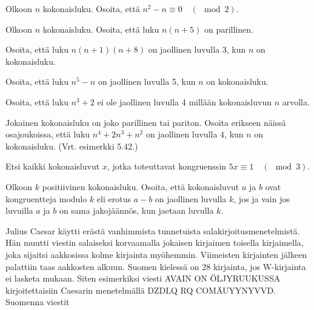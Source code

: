 \begin{tehtavasivu}
\begin{tehtava}
	Olkoon $n$ kokonaisluku. Osoita, että $n^2 - n \equiv 0\quad (\mod 2)$.
\end{tehtava}

\begin{tehtava}
	Olkoon $n$ kokonaisluku. Osoita, että luku $n(n + 5)$ on parillinen.
\end{tehtava}

\begin{tehtava}
	Osoita, että luku $n(n + 1)(n + 8)$ on jaollinen luvulla 3, kun $n$ on kokonaisluku.
\end{tehtava}

\begin{tehtava}
	Osoita, että luku $n^5 - n$ on jaollinen luvulla 5, kun $n$ on kokonaisluku.
\end{tehtava}

\begin{tehtava}
	Osoita, että luku $n^3 + 2$ ei ole jaollinen luvulla 4 millään kokonaisluvun $n$ arvolla.
\end{tehtava}

\begin{tehtava}
	Jokainen kokonaisluku on joko parillinen tai pariton. Osoita erikseen näissä osajoukoissa, että luku $n^4 + 2n^3 + n^2$ on jaollinen luvulla $4$, kun $n$ on kokonaisluku. (Vrt. esimerkki 5.42.)
\end{tehtava}

\begin{tehtava}
	Etsi kaikki kokonaisluvut $x$, jotka toteuttavat kongruenssin $5x\equiv 1 \quad (\mod 3)$.
\end{tehtava}

\begin{tehtava}
	Olkoon $k$ positiivinen kokonaisluku. Osoita, että kokonaisluvut $a$ ja $b$ ovat kongruentteja modulo $k$ eli erotus $a-b$ on jaollinen luvulla $k$, jos ja vain jos luvuilla $a$ ja $b$ on sama jakojäännös, kun jaetaan luvulla $k$.
\end{tehtava}

\begin{tehtava}
	Julius Caesar käytti erästä vanhimmista tunnetuista salakirjoitusmenetelmistä. Hän muutti viestin salaiseksi korvaamalla jokaisen kirjaimen toisella kirjaimella, joka sijaitsi aakkosissa kolme kirjainta myöhemmin. Viimeisten kirjainten jälkeen palattiin taas aakkosten alkuun. Suomen kielessä on 28 kirjainta, jos W-kirjainta ei lasketa mukaan. Siten esimerkiksi viesti AVAIN ON ÖLJYRUUKUSSA kirjoitettaisiin Caesarin menetelmällä DZDLQ RQ COMÄUYYNYVVD. Suomenna viestit 
\end{tehtava}


\end{tehtavasivu}
